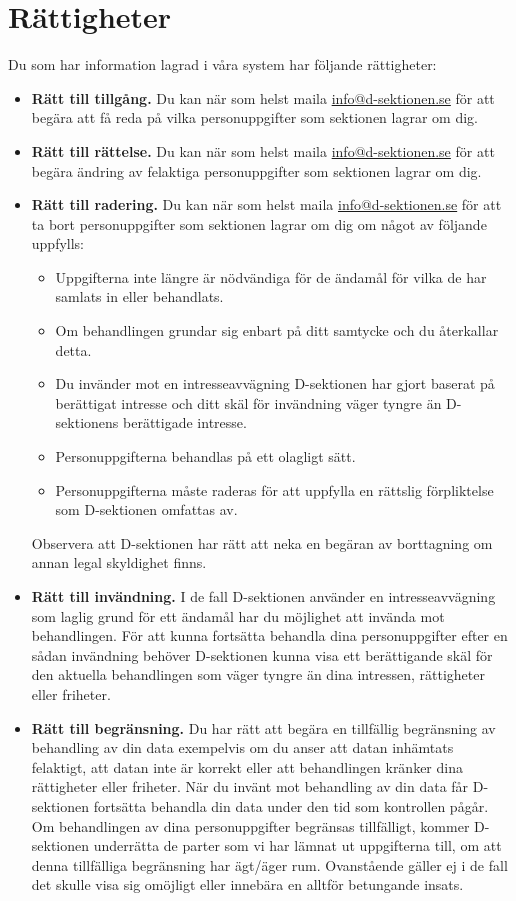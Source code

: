 \documentclass{datateknologsektionen-document}
\makeatletter
\newcommand*{\infomail}{\href{mailto://info@d-sektionen.se}{info@d-sektionen.se}}
\makeatother
\begin{document}
\section{Rättigheter}
Du som har information lagrad i våra system har följande rättigheter:
\begin{itemize}
  \item \textbf{Rätt till tillgång.} Du kan när som helst maila \infomail{} för att begära att få reda på vilka personuppgifter som sektionen lagrar om dig.
  \item \textbf{Rätt till rättelse.} Du kan när som helst maila \infomail{} för att begära ändring av felaktiga personuppgifter som sektionen lagrar om dig.
  \item \textbf{Rätt till radering.} Du kan när som helst maila \infomail{} för att ta bort personuppgifter som sektionen lagrar om dig om något av följande uppfylls:
        \begin{itemize}
          \item Uppgifterna inte längre är nödvändiga för de ändamål för vilka de har samlats in eller behandlats.
          \item Om behandlingen grundar sig enbart på ditt samtycke och du återkallar detta.
          \item Du invänder mot en intresseavvägning D-sektionen har gjort baserat på berättigat intresse och ditt skäl för invändning väger tyngre än D-sektionens berättigade intresse.
          \item Personuppgifterna behandlas på ett olagligt sätt.
          \item Personuppgifterna måste raderas för att uppfylla en rättslig förpliktelse som D-sektionen omfattas av.
        \end{itemize}
        Observera att D-sektionen har rätt att neka en begäran av borttagning om annan legal skyldighet finns.
  \item \textbf{Rätt till invändning.} I de fall D-sektionen använder en intresseavvägning som laglig grund för ett ändamål har du möjlighet att invända mot behandlingen. För att kunna fortsätta behandla dina personuppgifter efter en sådan invändning behöver D-sektionen kunna visa ett berättigande skäl för den aktuella behandlingen som väger tyngre än dina intressen, rättigheter eller friheter.
  \item \textbf{Rätt till begränsning.} Du har rätt att begära en tillfällig begränsning av behandling av din data exempelvis om du anser att datan inhämtats felaktigt, att datan inte är korrekt eller att behandlingen kränker dina rättigheter eller friheter. När du invänt mot behandling av din data får D-sektionen fortsätta behandla din data under den tid som kontrollen pågår. Om behandlingen av dina personuppgifter begränsas tillfälligt, kommer D-sektionen underrätta de parter som vi har lämnat ut uppgifterna till, om att denna tillfälliga begränsning har ägt/äger rum. Ovanstående gäller ej i de fall det skulle visa sig omöjligt eller innebära en alltför betungande insats.

\end{itemize}
\end{document}
